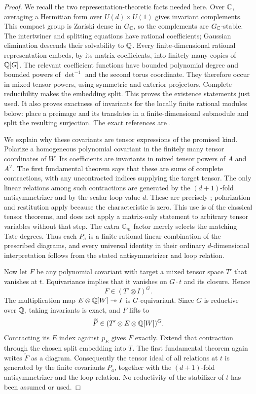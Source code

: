 \begin{proof}
We recall the two representation-theoretic facts needed here.
Over $\mathbb C$, averaging a Hermitian form over
$U(d)\times U(1)$ gives invariant complements.  This compact group
is Zariski dense in $G_\mathbb C$, so the complements are $G_\mathbb C$-stable.
The intertwiner and splitting equations have rational coefficients;
Gaussian elimination descends their solvability to $\mathbb Q$.
Every finite-dimensional rational representation embeds, by its
matrix coefficients, into finitely many copies of $\mathbb Q[G]$.
The relevant coefficient functions have bounded polynomial degree
and bounded powers of $\det^{-1}$ and the second torus coordinate.
They therefore occur in mixed tensor powers, using symmetric and
exterior projectors.  Complete reducibility makes the embedding
split.  This proves the existence statements just used.  It also
proves exactness of invariants for the locally finite rational
modules below: place a preimage and its translates in a
finite-dimensional submodule and split the resulting surjection.
The exact references are \citet[Theorem~4.14, pp.~88--89;
Theorem~22.42, pp.~478--479; Remark~12.53(a), p.~248,
and the Reynolds operator on p.~249]{c_milneag2022}.

We explain why these covariants are tensor expressions of the promised
kind.  Polarize a homogeneous polynomial covariant in the finitely
many tensor coordinates of $W$.  Its coefficients are invariants in
mixed tensor powers of $A$ and $A^\vee$.  The first fundamental
theorem says that these are sums of complete contractions, with any
uncontracted indices supplying the target tensor.  The only linear
relations among such contractions are generated by the
$(d+1)$-fold antisymmetrizer and by the scalar loop value $d$.
These are precisely \citet[Theorems~1.2--1.5, pp.~4--5]{c_procesi2021tensor};
polarization and restitution apply because the characteristic is zero.
This use is of the classical tensor theorems, and does not apply a
matrix-only statement to arbitrary tensor variables without that step.
The extra $\mathbb G_m$ factor merely selects the matching Tate
degrees.  Thus each $P_a$ is a finite rational linear combination of
the prescribed diagrams, and every universal identity in their
ordinary $d$-dimensional interpretation follows from the stated
antisymmetrizer and loop relation.

Now let $F$ be any polynomial covariant with target a mixed tensor
space $T'$ that vanishes at $t$.  Equivariance implies that it
vanishes on $G\cdot t$ and its closure.  Hence
\[
 F\in(T'\otimes I)^G.
\]
The multiplication map $E\otimes\mathbb Q[W]\twoheadrightarrow I$ is
$G$-equivariant.  Since $G$ is reductive over $\mathbb Q$, taking invariants
is exact, and $F$ lifts to
\[
 \widetilde F\in(T'\otimes E\otimes\mathbb Q[W])^G.
\]
Contracting its $E$ index against $p_E$ gives $F$ exactly.  Extend
that contraction through the chosen split embedding into $T$.
The first fundamental theorem again writes $\widetilde F$ as a
diagram.  Consequently the tensor ideal of all relations at $t$
is generated by the finite covariants $P_a$, together with the
$(d+1)$-fold antisymmetrizer and the loop relation.  No reductivity
of the stabilizer of $t$ has been assumed or used.


\end{proof}
